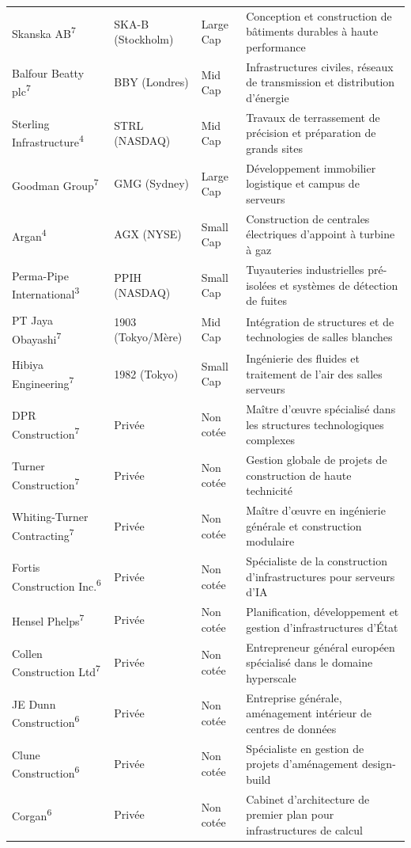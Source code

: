 \documentclass[11pt,a4paper]{article}
\begin{document}
\begin{longtable}{p{3cm} p{3.5cm} p{3cm} p{5cm}}
Skanska AB\textsuperscript{7} & SKA-B (Stockholm) & Large Cap & Conception et construction de bâtiments durables à haute performance \\
Balfour Beatty plc\textsuperscript{7} & BBY (Londres) & Mid Cap & Infrastructures civiles, réseaux de transmission et distribution d'énergie \\
Sterling Infrastructure\textsuperscript{4} & STRL (NASDAQ) & Mid Cap & Travaux de terrassement de précision et préparation de grands sites \\
Goodman Group\textsuperscript{7} & GMG (Sydney) & Large Cap & Développement immobilier logistique et campus de serveurs \\
Argan\textsuperscript{4} & AGX (NYSE) & Small Cap & Construction de centrales électriques d'appoint à turbine à gaz \\
Perma-Pipe International\textsuperscript{3} & PPIH (NASDAQ) & Small Cap & Tuyauteries industrielles pré-isolées et systèmes de détection de fuites \\
PT Jaya Obayashi\textsuperscript{7} & 1903 (Tokyo/Mère) & Mid Cap & Intégration de structures et de technologies de salles blanches \\
Hibiya Engineering\textsuperscript{7} & 1982 (Tokyo) & Small Cap & Ingénierie des fluides et traitement de l'air des salles serveurs \\
DPR Construction\textsuperscript{7} & Privée & Non cotée & Maître d'œuvre spécialisé dans les structures technologiques complexes \\
Turner Construction\textsuperscript{7} & Privée & Non cotée & Gestion globale de projets de construction de haute technicité \\
Whiting-Turner Contracting\textsuperscript{7} & Privée & Non cotée & Maître d'œuvre en ingénierie générale et construction modulaire \\
Fortis Construction Inc.\textsuperscript{6} & Privée & Non cotée & Spécialiste de la construction d'infrastructures pour serveurs d'IA \\
Hensel Phelps\textsuperscript{7} & Privée & Non cotée & Planification, développement et gestion d'infrastructures d'État \\
Collen Construction Ltd\textsuperscript{7} & Privée & Non cotée & Entrepreneur général européen spécialisé dans le domaine hyperscale \\
JE Dunn Construction\textsuperscript{6} & Privée & Non cotée & Entreprise générale, aménagement intérieur de centres de données \\
Clune Construction\textsuperscript{6} & Privée & Non cotée & Spécialiste en gestion de projets d'aménagement design-build \\
Corgan\textsuperscript{6} & Privée & Non cotée & Cabinet d'architecture de premier plan pour infrastructures de calcul \\
\bottomrule
\end{longtable}
\end{document}
